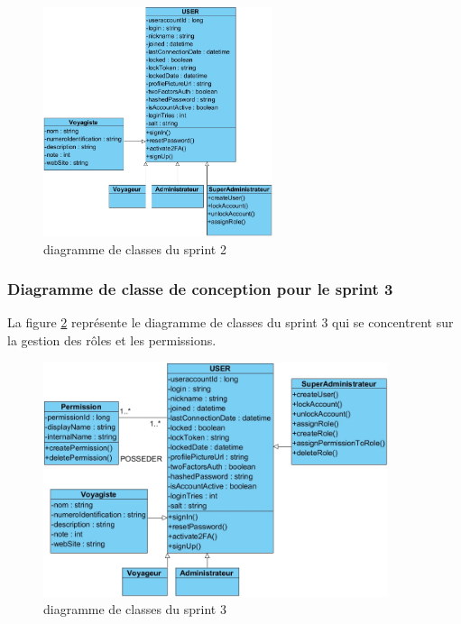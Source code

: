 \documentclass[12pt]{report}
\begin{document}
			\begin{figure}[h]
				\centering
				\includegraphics[width=0.6\textwidth]{sprint2.jpg}
				\caption{diagramme de classes du sprint 2}
				\label{fig:sprint2}
			\end{figure}
			\FloatBarrier

			\subsubsection{Diagramme de classe de conception pour le sprint 3}
				
			\hspace{15pt} La figure \ref{fig:sprint3} représente le diagramme de classes du sprint 3 qui se concentrent sur la gestion des rôles et
les permissions.


			\begin{figure}[h]
				\centering
				\includegraphics[width=0.9\textwidth]{sprint3.jpg}
				\caption{diagramme de classes du sprint 3}
				\label{fig:sprint3}
			\end{figure}
			\FloatBarrier
\end{document}
